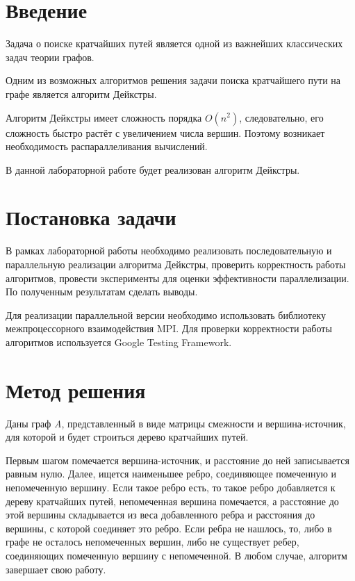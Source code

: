 \documentclass{report}
\begin{document}
\setcounter{page}{2}

\tableofcontents
\newpage

\section*{Введение}
Задача о поиске кратчайших путей является одной из важнейших классических задач теории графов.
\par Одним из возможных алгоритмов решения задачи поиска кратчайшего пути на графе является алгоритм Дейкстры.
\par Алгоритм Дейкстры имеет сложность порядка  $O(n^2)$, следовательно, его сложность быстро растёт с увеличением числа вершин. Поэтому возникает необходимость распараллеливания вычислений. 
\par В данной лабораторной работе будет реализован алгоритм Дейкстры.
\newpage

\section*{Постановка задачи}
В рамках лабораторной работы необходимо реализовать последовательную и параллельную реализации алгоритма Дейкстры, проверить корректность работы алгоритмов, провести эксперименты для оценки эффективности параллелизации. По полученным результатам сделать выводы.
\par Для реализации параллельной версии необходимо использовать библиотеку межпроцессорного взаимодействия MPI. Для проверки корректности работы алгоритмов используется Google Testing Framework.
\newpage

\section*{Метод решения}
Даны граф {\itshape A}, представленный в виде матрицы смежности и вершина-источник, для которой и будет строиться дерево кратчайших путей.
\par Первым шагом помечается вершина-источник, и расстояние до ней записывается равным нулю. Далее, ищется наименьшее ребро, соединяющее помеченную и непомеченную вершину. Если такое ребро есть, то такое ребро добавляется к дереву кратчайших путей, непомеченная вершина помечается, а расстояние до этой вершины складывается из веса добавленного ребра и расстояния до вершины, с которой соединяет это ребро. Если ребра не нашлось, то, либо в графе не осталось непомеченных вершин, либо не существует ребер, соединяющих помеченную вершину с непомеченной. В любом случае, алгоритм завершает свою работу.
\newpage
\end{document}
